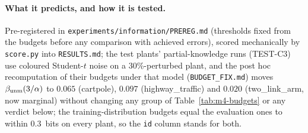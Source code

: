 \paragraph{What it predicts, and how it is tested.} Pre-registered in \texttt{experiments/information/PREREG.md}
(thresholds fixed from the budgets before any comparison with achieved errors), scored mechanically by
\texttt{score.py} into \texttt{RESULTS.md}; the test plants' partial-knowledge runs (TEST-C3) use coloured Student-$t$
noise on a $30\%$-perturbed plant, and the post hoc recomputation of their budgets under that model
(\texttt{BUDGET\_FIX.md}) moves $\beta_{\rm unm}(3/\alpha)$ to $0.065$ (cartpole), $0.097$ (highway\_traffic) and $0.020$
(two\_link\_arm, now marginal) without changing any group of Table~\ref{tab:m4-budgets} or any verdict below; the training-distribution budgets equal the evaluation ones to within
$0.3$~bits on every plant, so the \texttt{id} column stands for both.

